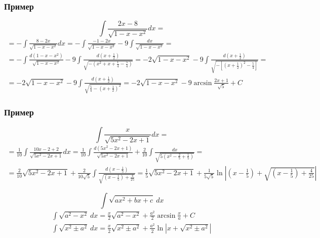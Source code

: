 \documentclass{article}
\begin{document}
\subsubsection{Пример}
\[
    \int \frac{2x - 8}{\sqrt{1 - x - x^2}} dx =
\]
\begin{gather*}
    = -\int \frac{8 - 2x}{\sqrt{1 - x - x^2}} dx =
      -\int \frac{-1 - 2x}{\sqrt{1 - x - x^2}} - 9\int \frac{dx}{\sqrt{1 - x - x^2}} = \\
    = -\int \frac{d(1 - x - x^2)}{\sqrt{1 - x - x^2}} - 
      9\int \frac{d \left(x + \frac{1}{2}\right)}{\sqrt{-\left(x^2 + x + \frac{1}{4} - \frac{5}{4}\right)}} =
      -2\sqrt{1 - x - x^2} -
      9\int \frac{d \left(x + \frac{1}{2}\right)}{\sqrt{-\left[\left(x + \frac{1}{2}\right)^2 - \frac{5}{4}\right]}} = \\
    = -2\sqrt{1 - x - x^2} - 
      9\int \frac{d \left(x + \frac{1}{2}\right)}{\sqrt{\frac{5}{4} - \left(x + \frac{1}{2}\right)^2}} =
      -2\sqrt{1 - x - x^2} - 9\arcsin \frac{2x + 1}{\sqrt{5}} + C
\end{gather*}

\subsubsection{Пример}
\[
    \int \frac{x}{\sqrt{5x^2 - 2x + 1}} dx =
\]
\begin{gather*}
    = \frac{1}{10} \int \frac{10x - 2 + 2}{\sqrt{5x^2 - 2x + 1}} dx =
      \frac{1}{10} \int \frac{d(5x^2 - 2x + 1)}{\sqrt{5x^2 - 2x + 1}} + 
      \frac{2}{10} \int \frac{dx}{\sqrt{5 \left(x^2 - \frac{2}{5} + \frac{1}{5}\right)}} = \\
    = \frac{2}{10} \sqrt{5x^2 - 2x + 1} + 
      \frac{2}{10\sqrt{5}} \int \frac{d \left(x - \frac{1}{5}\right)}{\sqrt{\left(x - \frac{1}{5}\right) + \frac{4}{25}}} =
      \frac{1}{5} \sqrt{5x^2 - 2x + 1} + 
      \frac{1}{5\sqrt{5}} \ln \left|\left(x - \frac{1}{5}\right) + \sqrt{\left(x - \frac{1}{5}\right) + \frac{4}{25}}\right|
\end{gather*}




\[
    \int \sqrt{ax^2 + bx + c} ~dx
\]  
\begin{gather*}
    \int \sqrt{a^2 - x^2} ~dx = \frac{x}{2} \sqrt{a^2 - x^2} + \frac{a^2}{2} \arcsin \frac{x}{a} + C \\
    \int \sqrt{x^2 \pm a^2} ~dx = \frac{x}{2} \sqrt{x^2 \pm a^2} + \frac{a^2}{2} \ln \left|x + \sqrt{x^2 \pm a^2}\right|
\end{gather*}
\end{document}
